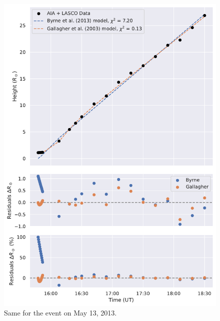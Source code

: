 \begin{figure}[!htp]
	\centering
	\includegraphics[width=0.8\hsize]{chapter2/figs/appendix/height_profile_residuals_aia_lasco_130513_01.pdf}
	\caption{Same for the event on May 13, 2013.}
\end{figure}

